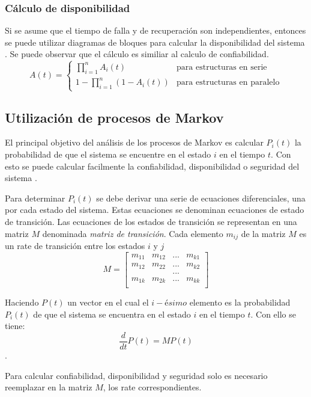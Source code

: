 \subsubsection{Cálculo de disponibilidad}
Si se asume que el tiempo de falla y de recuperación son independientes, entonces se puede utilizar diagramas de bloques para calcular la disponibilidad
del sistema  \citep{FTDesign}.  Se puede observar que el cálculo es similiar al calculo de confiabilidad.
 $$A(t) = \left \{
 \begin{matrix}
   \prod_{i=1}^{n} A_{i}(t) & \text{para estructuras en serie}\\
   1 - \prod_{i=1}^{n}(1-A_{i}(t)) & \text{para estructuras en paralelo}
 \end{matrix} $$

\subsection{Utilización de procesos de Markov}
El principal objetivo del análisis de los procesos de Markov es calcular $P_i(t)$ la probabilidad de que el sistema se encuentre en el estado $i$
en el tiempo $t$. Con esto se puede calcular facilmente la confiabilidad, disponibilidad o seguridad del sistema \citep{FTDesign}.

Para determinar $P_i(t)$ se debe derivar una serie de ecuaciones diferenciales, una por cada estado del sistema. Estas ecuaciones se denominan ecuaciones de estado de transición. Las ecuaciones de los estados de transición se representan en una matriz $M$ denominada \textit{matriz de transición}. Cada elemento $m_{ij}$ de la matriz $M$ es un rate de transición entre los estados $i$ y $j$
$$M = \left [
\begin{matrix}
  m_{11}  & m_{12}  & ... & m_{k1} \\
  m_{12}  & m_{22}  & ... & m_{k2} \\
          &         & ... &        \\
  m_{1k}  & m_{2k}  & ... & m_{kk} \\
\end{matrix}
\right ]
$$

Haciendo $P(t)$ un vector en el cual el $i-ésimo$ elemento es la probabilidad $P_i(t)$ de que el sistema se encuentra en el estado $i$ en el tiempo $t$. Con ello se tiene: $$\frac{d}{dt}P(t) = MP(t)$$ \citep{FTDesign}.

Para calcular confiabilidad, disponibilidad y seguridad solo es necesario reemplazar en la matriz $M$, los rate correspondientes.
